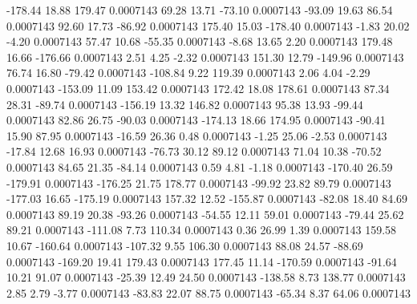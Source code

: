      -178.44       18.88      179.47     0.0007143
       69.28       13.71      -73.10     0.0007143
      -93.09       19.63       86.54     0.0007143
       92.60       17.73      -86.92     0.0007143
      175.40       15.03     -178.40     0.0007143
       -1.83       20.02       -4.20     0.0007143
       57.47       10.68      -55.35     0.0007143
       -8.68       13.65        2.20     0.0007143
      179.48       16.66     -176.66     0.0007143
        2.51        4.25       -2.32     0.0007143
      151.30       12.79     -149.96     0.0007143
       76.74       16.80      -79.42     0.0007143
     -108.84        9.22      119.39     0.0007143
        2.06        4.04       -2.29     0.0007143
     -153.09       11.09      153.42     0.0007143
      172.42       18.08      178.61     0.0007143
       87.34       28.31      -89.74     0.0007143
     -156.19       13.32      146.82     0.0007143
       95.38       13.93      -99.44     0.0007143
       82.86       26.75      -90.03     0.0007143
     -174.13       18.66      174.95     0.0007143
      -90.41       15.90       87.95     0.0007143
      -16.59       26.36        0.48     0.0007143
       -1.25       25.06       -2.53     0.0007143
      -17.84       12.68       16.93     0.0007143
      -76.73       30.12       89.12     0.0007143
       71.04       10.38      -70.52     0.0007143
       84.65       21.35      -84.14     0.0007143
        0.59        4.81       -1.18     0.0007143
     -170.40       26.59     -179.91     0.0007143
     -176.25       21.75      178.77     0.0007143
      -99.92       23.82       89.79     0.0007143
     -177.03       16.65     -175.19     0.0007143
      157.32       12.52     -155.87     0.0007143
      -82.08       18.40       84.69     0.0007143
       89.19       20.38      -93.26     0.0007143
      -54.55       12.11       59.01     0.0007143
      -79.44       25.62       89.21     0.0007143
     -111.08        7.73      110.34     0.0007143
        0.36       26.99        1.39     0.0007143
      159.58       10.67     -160.64     0.0007143
     -107.32        9.55      106.30     0.0007143
       88.08       24.57      -88.69     0.0007143
     -169.20       19.41      179.43     0.0007143
      177.45       11.14     -170.59     0.0007143
      -91.64       10.21       91.07     0.0007143
      -25.39       12.49       24.50     0.0007143
     -138.58        8.73      138.77     0.0007143
        2.85        2.79       -3.77     0.0007143
      -83.83       22.07       88.75     0.0007143
      -65.34        8.37       64.06     0.0007143
